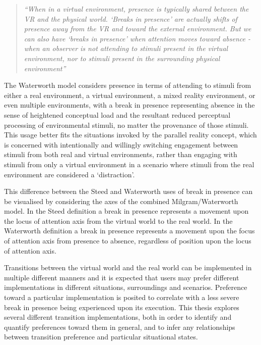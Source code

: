 \begin{quote}
	\textit{``When in a virtual environment, presence is typically shared between the VR and the physical world. `Breaks in presence' are actually shifts of presence away from the VR and toward the external environment. But we can also have `breaks in presence' when attention moves toward absence - when an observer is not attending to stimuli present in the virtual environment, nor to stimuli present in the surrounding physical environment''}~\cite{Waterworth2001}
\end{quote}

The Waterworth model considers presence in terms of attending to stimuli from either a real environment, a virtual environment, a mixed reality environment, or even multiple environments, with a break in presence representing absence in the sense of heightened conceptual load and the resultant reduced perceptual processing of environmental stimuli, no matter the provenance of those stimuli. This usage better fits the situations invoked by the parallel reality concept, which is concerned with intentionally and willingly switching engagement between stimuli from both real and virtual environments, rather than engaging with stimuli from only a virtual environment in a scenario where stimuli from the real environment are considered a `distraction'.

This difference between the Steed and Waterworth uses of break in presence can be visualised by considering the axes of the combined Milgram/Waterworth model. In the Steed definition a break in presence represents a movement upon the locus of attention axis from the virtual world to the real world. In the Waterworth definition a break in presence represents a movement upon the focus of attention axis from presence to absence, regardless of position upon the locus of attention axis.

Transitions between the virtual world and the real world can be implemented in multiple different manners and it is expected that users may prefer different implementations in different situations, surroundings and scenarios. Preference toward a particular implementation is posited to correlate with a less severe break in presence being experienced upon its execution. This thesis explores several different transition implementations, both in order to identify and quantify preferences toward them in general, and to infer any relationships between transition preference and particular situational states.


